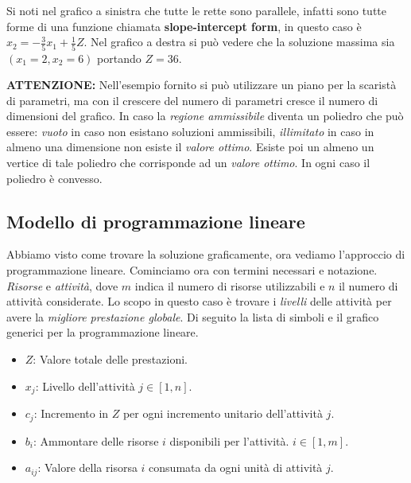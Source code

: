 \documentclass{article}
\begin{document}
Si noti nel grafico a sinistra che tutte le rette sono parallele, infatti sono tutte forme di una funzione chiamata \textbf{slope-intercept form}, in questo caso è $x_2=-\frac{3}{5}x_1+\frac{1}{5}Z$. Nel grafico a destra si può vedere che la soluzione massima sia $(x_1=2,x_2=6)$ portando $Z=36$.

\begin{tcolorbox}
  \textbf{ATTENZIONE:}
  Nell'esempio fornito si può utilizzare un piano per la scaristà di parametri, ma con il crescere del numero di parametri cresce il numero di dimensioni del grafico. In caso la \textit{regione ammissibile} diventa un poliedro che può essere: \textit{vuoto} in caso non esistano soluzioni ammissibili, \textit{illimitato} in caso in almeno una dimensione non esiste il \textit{valore ottimo}. Esiste poi un almeno un vertice di tale poliedro che corrisponde ad un \textit{valore ottimo}. In ogni caso il poliedro è convesso.

\end{tcolorbox}

\subsection{Modello di programmazione lineare}
Abbiamo visto come trovare la soluzione graficamente, ora vediamo l'approccio di programmazione lineare. Cominciamo ora con termini necessari e notazione. \textit{Risorse} e \textit{attività}, dove $m$ indica il numero di risorse utilizzabili e $n$ il numero di attività considerate. Lo scopo in questo caso è trovare i \textit{livelli} delle attività per avere la \textit{migliore prestazione globale}. Di seguito la lista di simboli e il grafico generici per la programmazione lineare.
\begin{itemize}
  \item $Z$: Valore totale delle prestazioni.
  \item $x_j$: Livello dell'attività $j\in[1,n]$.
  \item $c_j$: Incremento in $Z$ per ogni incremento unitario dell'attività $j$.
  \item $b_i$: Ammontare delle risorse $i$ disponibili per l'attività. $i\in[1,m]$.
  \item $a_{ij}$: Valore della risorsa $i$ consumata da ogni unità di attività $j$.
\end{itemize}
\end{document}
